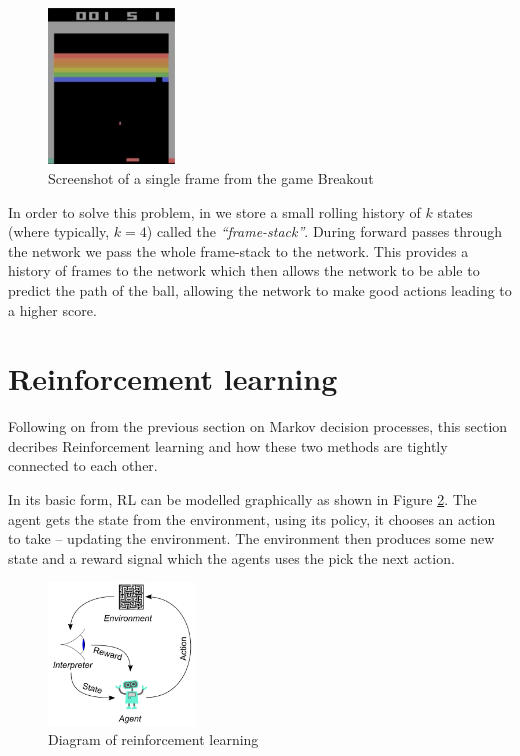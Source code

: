 \begin{figure}[htbp]
	\centering
	\includegraphics[width=0.30\textwidth]{chapters/chapter3/images/breakout.png}
	\caption[Screenshot of single breakout frame]{Screenshot of a single frame from the game Breakout
		\label{fig:breakout-brick-fig}
	}
\end{figure}

In order to solve this problem, in we store a small rolling history of $k$ states (where typically, $k = 4$) called the \textit{``frame-stack''}. During forward passes through the network we pass the whole frame-stack to the network. This provides a history of frames to the network which then allows the network to be able to predict the path of the ball, allowing the network to make good actions leading to a higher score.

\section{Reinforcement learning}
\label{dsgn:sec:rl}
Following on from the previous section on Markov decision processes, this section decribes Reinforcement learning and how these two methods are tightly connected to each other.

In its basic form, RL can be modelled graphically as shown in Figure \ref{fig:rl-diagram}. The agent gets the state from the environment, using its policy, it chooses an action to take -- updating the environment. The environment then produces some new state and a reward signal which the agents uses the pick the next action.

\begin{figure}[htbp]
	\centering
	\includegraphics[width=0.35\textwidth]{chapters/chapter3/images/rl.jpg}
	\caption{Diagram of reinforcement learning
		\label{fig:rl-diagram}
	}
\end{figure}

